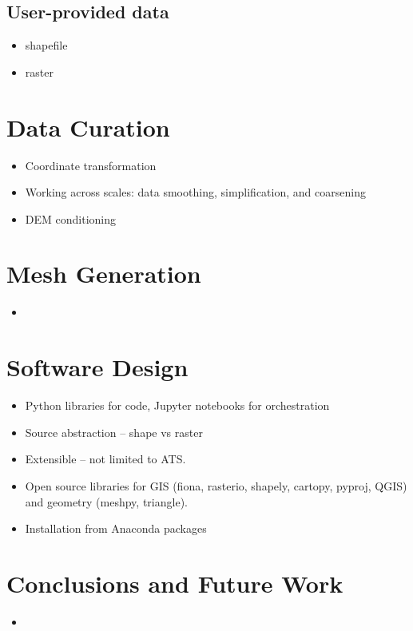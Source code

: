 \documentclass[a4paper,fleqn]{cas-dc}
\begin{document}
\subsection{User-provided data}\label{ssc:acquisition:user}
%
\begin{itemize}
\item shapefile
\item raster
\end{itemize}


\section{Data Curation}\label{sec:data_curation}
%
\begin{itemize}
\item Coordinate transformation
\item Working across scales: data smoothing, simplification, and coarsening
\item DEM conditioning
\end{itemize}

\section{Mesh Generation}\label{sec:meshes}
%
\begin{itemize}
\item 
\end{itemize}

\section{Software Design}\label{sec:approach}
%
\begin{itemize}
\item Python libraries for code, Jupyter notebooks for orchestration
\item Source abstraction -- shape vs raster
\item Extensible -- not limited to ATS.
\item Open source libraries for GIS (fiona, rasterio, shapely, cartopy, pyproj, QGIS) and geometry (meshpy, triangle).
\item Installation from Anaconda packages
\end{itemize}

\section{Conclusions and Future Work}\label{sec:conclusions}
%
\begin{itemize}
\item 
\end{itemize}
\end{document}
